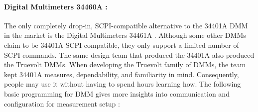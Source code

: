 \paragraph{Digital Multimeters 34460A :}


The only completely drop-in, SCPI-compatible alternative to the 34401A DMM in the market is the Digital Multimeters 34461A \cite{Keysight_34460A_DMM}. Although some other DMMs claim to be 34401A SCPI compatible, they only support a limited number of SCPI commands. The same design team that produced the 34401A also produced the Truevolt DMMs. When developing the Truevolt family of DMMs, the team kept 34401A measures, dependability, and familiarity in mind. Consequently, people may use it without having to spend hours learning how.
The following basic programming for DMM gives more insights into communication and configuration for measurement setup :

